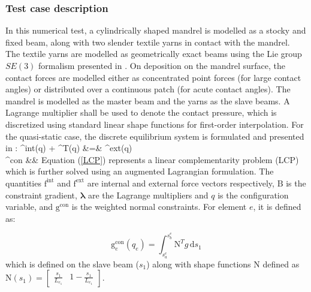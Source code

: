 \subsubsection{Test case description}
In this numerical test, a cylindrically shaped mandrel is modelled as a stocky and fixed beam, along with two slender textile yarns in contact with the mandrel.\\
The textile yarns are modelled as geometrically exact beams using the Lie group $SE(3)$ formalism presented in \cite{sonneville2014geometrically}. On deposition on the mandrel surface, the contact forces are modelled either as concentrated point forces (for large contact angles) or distributed over a continuous patch (for acute contact angles). The mandrel is modelled as the master beam and the yarns as the slave beams. A Lagrange multiplier shall be used to denote the contact pressure, which is discretized using standard linear shape functions for first-order interpolation. For the quasi-static case, the discrete equilibrium system is formulated and presented in \cite{bosten2022mortar}:
%
\bea\label{equilibrium}
^{\textrm{int}}(q) + ^{T}(q) \boldsymbol{\lambda} &=& ^{\textrm{ext}}(q)\\ %
 \leq \boldsymbol{\lambda} \perp {}^{\textrm{con}} &\geq&  \label{LCP}
\eea
%
Equation (\ref{LCP}) represents a linear complementarity problem (LCP) which is further solved using an augmented Lagrangian formulation. 
The quantities $\boldsymbol{\mathrm{f}}^{\textrm{int}}$ and $\boldsymbol{\mathrm{f}}^{\textrm{ext}}$ are internal and external force vectors respectively, $\boldsymbol{\mathrm{B}}$ is the constraint gradient, $\boldsymbol{\lambda}$ are the Lagrange multipliers and $q$ is the configuration variable, and $\boldsymbol{\mathrm{g}}^{\textrm{con}}$ is the weighted normal constraints. For element $e$, it is defined as: 

\begin{equation}
    \boldsymbol{\mathrm{g}}_e^{\textrm{con}}(q_e) = \int_{s^e_{a}}^{s^e_{b}} \boldsymbol{\mathrm{N}}^{T} g \, \mathrm{d}s_1
\end{equation}
which is defined on the slave beam ($s_1$) along with shape functions $\boldsymbol{\mathrm{N}}$ defined as $\boldsymbol{\mathrm{N}} (s_1) = \begin{bmatrix}
\frac{s_1}{L_{e_1}} & 1 - \frac{s_1}{L_{e_1}} 
\end{bmatrix}$. 

